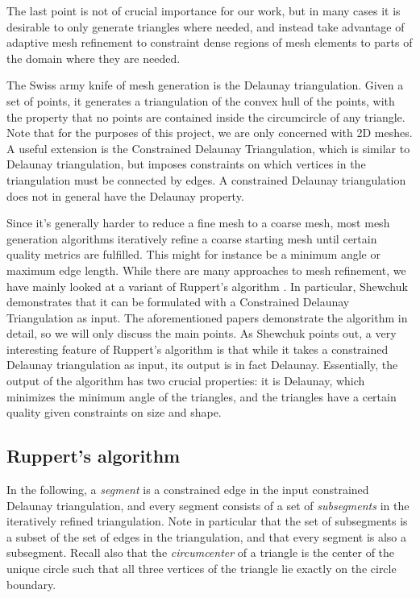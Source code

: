 \documentclass[10pt,a4paper]{article}
\begin{document}
The last point is not of crucial importance for our work, but in many cases it is desirable to only generate triangles where needed, and instead take advantage of adaptive mesh refinement to constraint dense regions of mesh elements to parts of the domain where they are needed.

The Swiss army knife of mesh generation is the Delaunay triangulation. Given a set of points, it generates a triangulation of the convex hull of the points, with the property that no points are contained inside the circumcircle of any triangle. Note that for the purposes of this project, we are only concerned with 2D meshes. A useful extension is the Constrained Delaunay Triangulation, which is similar to Delaunay triangulation, but imposes constraints on which vertices in the triangulation must be connected by edges. A constrained Delaunay triangulation does not in general have the Delaunay property.

Since it's generally harder to reduce a fine mesh to a coarse mesh, most mesh generation algorithms iteratively refine a coarse starting mesh until certain quality metrics are fulfilled. This might for instance be a minimum angle or maximum edge length. While there are many approaches to mesh refinement, we have mainly looked at a variant of Ruppert's algorithm \cite{ruppert}. In particular, Shewchuk \cite{shewchuk} demonstrates that it can be formulated with a Constrained Delaunay Triangulation as input. The aforementioned papers demonstrate the algorithm in detail, so we will only discuss the main points. As Shewchuk points out, a very interesting feature of Ruppert's algorithm is that while it takes a constrained Delaunay triangulation as input, its output is in fact Delaunay. Essentially, the output of the algorithm has two crucial properties: it is Delaunay, which minimizes the minimum angle of the triangles, and the triangles have a certain quality given constraints on size and shape.

\subsection*{Ruppert's algorithm}
In the following, a \emph{segment} is a constrained edge in the input constrained Delaunay triangulation, and every segment consists of a set of \emph{subsegments} in the iteratively refined triangulation. Note in particular that the set of subsegments is a subset of the set of edges in the triangulation, and that every segment is also a subsegment. Recall also that the \emph{circumcenter} of a triangle is the center of the unique circle such that all three vertices of the triangle lie exactly on the circle boundary.
\end{document}
